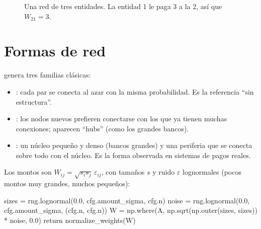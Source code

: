 \begin{figure}[h]
\centering
{}
\caption{Una red de tres entidades. La entidad 1 le paga 3 a la 2, así que $W_{21}=3$.}
\end{figure}

\section{Formas de red}
 genera tres familias clásicas:
\begin{itemize}
\item {}: cada par se conecta al azar con la misma probabilidad. Es la
referencia ``sin estructura''.
\item {}: los nodos nuevos prefieren conectarse con los que ya
tienen muchas conexiones; aparecen ``hubs'' (como los grandes bancos).
\item {}: un núcleo pequeño y denso (bancos grandes) y una
periferia que se conecta sobre todo con el núcleo. Es la forma observada en sistemas
de pagos reales.
\end{itemize}
Los montos son $W_{ij}=\sqrt{s_is_j}\,\varepsilon_{ij}$, con tamaños $s$ y ruido
$\varepsilon$ lognormales (pocos montos muy grandes, muchos pequeños):
\begin{codigo}[label=src/pulso/networks.py · generate]
sizes = rng.lognormal(0.0, cfg.amount_sigma, cfg.n)
noise = rng.lognormal(0.0, cfg.amount_sigma, (cfg.n, cfg.n))
W = np.where(A, np.sqrt(np.outer(sizes, sizes)) * noise, 0.0)
return normalize_weights(W)
\end{codigo}

